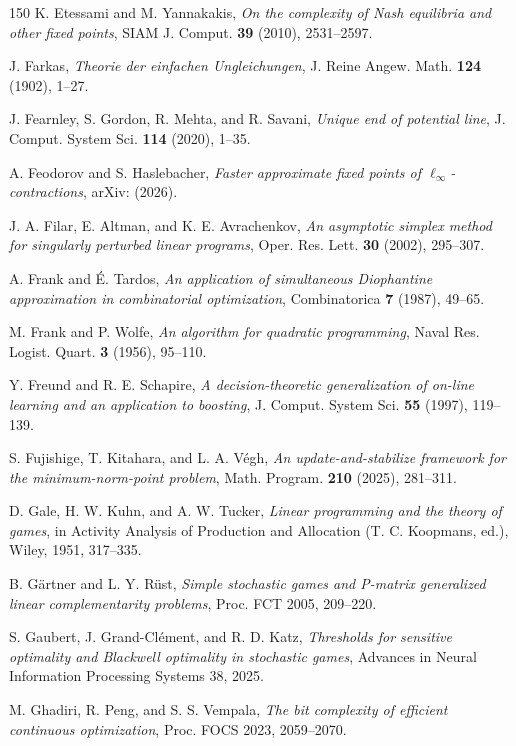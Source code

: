 \begin{thebibliography}{150}
K. Etessami and M. Yannakakis, \emph{On the complexity of Nash equilibria and other fixed points}, SIAM J. Comput. \textbf{39} (2010), 2531--2597.

J. Farkas, \emph{Theorie der einfachen Ungleichungen}, J. Reine Angew. Math. \textbf{124} (1902), 1--27.

J. Fearnley, S. Gordon, R. Mehta, and R. Savani, \emph{Unique end of potential line}, J. Comput. System Sci. \textbf{114} (2020), 1--35.

A. Feodorov and S. Haslebacher, \emph{Faster approximate fixed points of \(\ell_\infty\)-contractions}, arXiv: (2026).

J. A. Filar, E. Altman, and K. E. Avrachenkov, \emph{An asymptotic simplex method for singularly perturbed linear programs}, Oper. Res. Lett. \textbf{30} (2002), 295--307.

A. Frank and \'{E}. Tardos, \emph{An application of simultaneous Diophantine approximation in combinatorial optimization}, Combinatorica \textbf{7} (1987), 49--65.

M. Frank and P. Wolfe, \emph{An algorithm for quadratic programming}, Naval Res. Logist. Quart. \textbf{3} (1956), 95--110.

Y. Freund and R. E. Schapire, \emph{A decision-theoretic generalization of on-line learning and an application to boosting}, J. Comput. System Sci. \textbf{55} (1997), 119--139.

S. Fujishige, T. Kitahara, and L. A. V\'egh, \emph{An update-and-stabilize framework for the minimum-norm-point problem}, Math. Program. \textbf{210} (2025), 281--311.

D. Gale, H. W. Kuhn, and A. W. Tucker, \emph{Linear programming and the theory of games}, in Activity Analysis of Production and Allocation (T. C. Koopmans, ed.), Wiley, 1951, 317--335.

B. G\"artner and L. Y. R\"ust, \emph{Simple stochastic games and P-matrix generalized linear complementarity problems}, Proc. FCT 2005, 209--220.

S. Gaubert, J. Grand-Cl\'ement, and R. D. Katz, \emph{Thresholds for sensitive optimality and Blackwell optimality in stochastic games}, Advances in Neural Information Processing Systems 38, 2025.

M. Ghadiri, R. Peng, and S. S. Vempala, \emph{The bit complexity of efficient continuous optimization}, Proc. FOCS 2023, 2059--2070.


\end{thebibliography}

